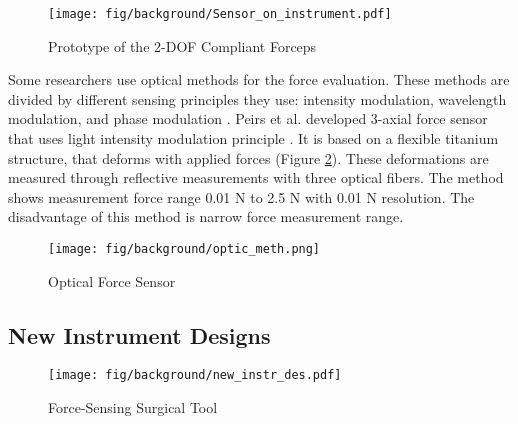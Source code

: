 \begin{figure}[h]
	\begin{center}
	\texttt{[image: fig/background/Sensor\_on\_instrument.pdf]}
	\end{center}
	\vspace{-4mm}
	\caption[Prototype of the 2-DOF Compliant Forceps]
	{Prototype of the 2-DOF Compliant Forceps \cite{hong_design_2012}}
	\label{fig:integr_sen}
	\vspace{-2mm}
\end{figure}

Some researchers use optical methods for the force evaluation. These methods are divided by different sensing principles they use: intensity modulation, wavelength modulation, and phase modulation \cite{su_fiber_optic_2017}. Peirs et al. developed 3-axial force sensor that uses light intensity modulation principle \cite{_micro_2004}. It is based on a flexible titanium structure, that deforms with applied forces (Figure \ref{fig:opt_sen}). These deformations are measured through reflective measurements with three optical fibers. The method shows measurement force range 0.01 N to 2.5 N with 0.01 N resolution. The disadvantage of this method is narrow force measurement range.

\begin{figure}[h]
	\begin{center}
	\texttt{[image: fig/background/optic\_meth.png]}
	\end{center}
	\vspace{-4mm}
	\caption[Optical Force Sensor]
	{Optical Force Sensor \cite{_micro_2004}}
	\label{fig:opt_sen}
	\vspace{-2mm}
\end{figure}

\subsection{New Instrument Designs}
\begin{figure}[h]
	\begin{center}
	\texttt{[image: fig/background/new\_instr\_des.pdf]}
	\end{center}
	\vspace{-4mm}
	\caption[Force-Sensing Surgical Tool]
	{ Force-Sensing Surgical Tool \cite{schwalb_forcesensing_2017}}
	\label{fig:force_sen_tool}
	\vspace{-2mm}
\end{figure}


